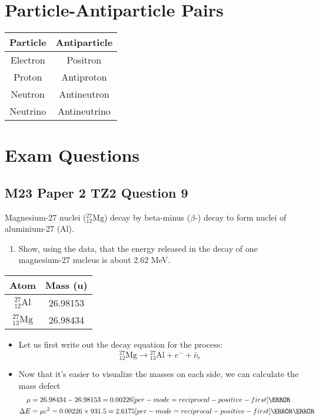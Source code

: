 \documentclass[a4paper,12pt]{article}
\let\oldsection\section
\renewcommand\section{\clearpage\oldsection}
\let\oldsi\si
\renewcommand{\si}[1]{\oldsi[per-mode=reciprocal-positive-first]{#1}}
\newcommand{\atom}[3]{{}^{#1}_{#2}\text{#3}}
\begin{document}
\pagebreak

\section{Particle-Antiparticle Pairs}

\begin{table}[H]
  \centering
  \begin{tabular}{|c|c|}
    \hline
    \rowcolor{blue!30}
    \textbf{Particle} & \textbf{Antiparticle} \\ \hline
    Electron          & Positron              \\ \hline
    Proton            & Antiproton            \\ \hline
    Neutron           & Antineutron           \\ \hline
    Neutrino          & Antineutrino          \\ \hline
  \end{tabular}
\end{table}

\section{Exam Questions}

\subsection{M23 Paper 2 TZ2 Question 9}

Magnesium-27 nuclei ($\atom{27}{12}{Mg}$) decay by beta-minus ($\beta$-) decay to form nuclei of aluminium-27 (Al).

\begin{enumerate}[label=(\alph*)]
  \item Show, using the data, that the energy released in the decay of one magnesium-27 nucleus is about 2.62 MeV.
\end{enumerate}
\begin{table}[H]
  \centering
  \begin{tabular}{|c|c|}\hline
    Atom                & Mass (u) \\ \hline
    $\atom{27}{12}{Al}$ & 26.98153 \\ \hline
    $\atom{27}{13}{Mg}$ & 26.98434 \\ \hline
  \end{tabular}
\end{table}

\begin{itemize}
  \item Let us first write out the decay equation for the process:
        $$\atom{27}{12}{Mg} \rightarrow \atom{27}{13}{Al} + e^- + \bar{\nu}_e$$
  \item Now that it's easier to visualize the masses on each side, we can calculate the mass defect
        \begin{align*}
          \mu      & = 26.98434 - 26.98153  = 0.00226 \si{\atomicmassunit}                           \\
          \Delta E & = \mu c^2         = 0.00226 \times 931.5 \approx 2.6175 \si{\mega\electronvolt}
        \end{align*}
\end{itemize}
\end{document}
